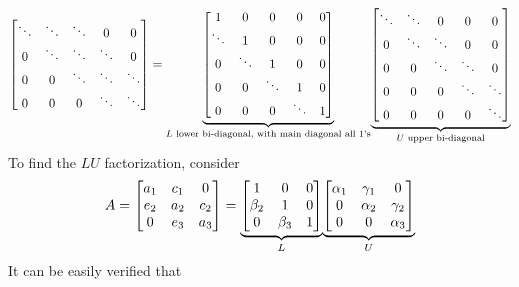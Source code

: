 \begin{itemize}
$$\begin{bmatrix}
            \ddots & \ddots & \ddots & 0 & 0\\
            0 & \ddots & \ddots & \ddots & 0\\
            0 & 0 & \ddots & \ddots & \ddots\\
            0 & 0 & 0 & \ddots & \ddots
        \end{bmatrix}=
        \underlabel{
            \begin{bmatrix}
                1 & 0 & 0 & 0 & 0\\
                \ddots & 1 & 0 & 0 & 0\\
                0 & \ddots & 1 & 0 & 0\\
                0 & 0 & \ddots & 1 & 0\\
                0 & 0 & 0 & \ddots & 1
                \end{bmatrix}
        }{$L$ lower bi-diagonal, with main diagonal all 1's}
        \underlabel{
            \begin{bmatrix}
                \ddots & \ddots & 0 & 0 & 0\\
                0 & \ddots & \ddots & 0 & 0\\
                0 & 0 & \ddots & \ddots & 0\\
                0 & 0 & 0 & \ddots & \ddots\\
                0 & 0 & 0 & 0 & \ddots
            \end{bmatrix}
        }{$U$ upper bi-diagonal}
        $$
        To find the $LU$ factorization, consider
        $$
        A=\begin{bmatrix}
            a_1 & c_1 & 0\\
            e_2 & a_2 & c_2\\
            0 & e_3 & a_3
        \end{bmatrix}=
        \underlabel{
            \begin{bmatrix}
                1 & 0 & 0\\
                \beta_2 & 1 & 0\\
                0 & \beta_3 & 1            
            \end{bmatrix}    
        }{$L$}
        \underlabel{
            \begin{bmatrix}
                \alpha_1 & \gamma_1 & 0\\
                0 & \alpha_2 & \gamma_2\\
                0 & 0 & \alpha_3
            \end{bmatrix}
        }{$U$}
        $$
        It can be easily verified that
        

\end{itemize}
